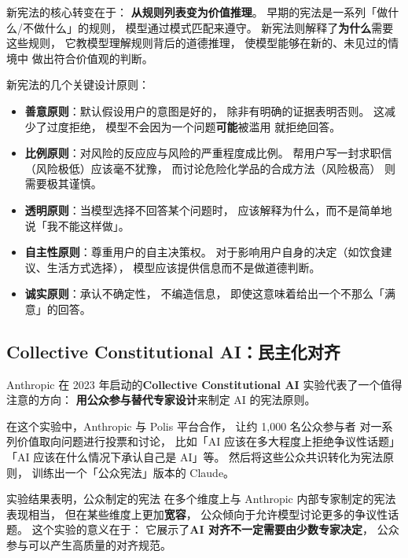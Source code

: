 
新宪法的核心转变在于：
\textbf{从规则列表变为价值推理}。
早期的宪法是一系列「做什么/不做什么」的规则，
模型通过模式匹配来遵守。
新宪法则解释了\textbf{为什么}需要这些规则，
它教模型理解规则背后的道德推理，
使模型能够在新的、未见过的情境中
做出符合价值观的判断。

新宪法的几个关键设计原则：
\begin{itemize}[noitemsep]
  \item \textbf{善意原则}：默认假设用户的意图是好的，
        除非有明确的证据表明否则。
        这减少了过度拒绝，
        模型不会因为一个问题\textbf{可能}被滥用
        就拒绝回答。
  \item \textbf{比例原则}：对风险的反应应与风险的严重程度成比例。
        帮用户写一封求职信（风险极低）应该毫不犹豫，
        而讨论危险化学品的合成方法（风险极高）
        则需要极其谨慎。
  \item \textbf{透明原则}：当模型选择不回答某个问题时，
        应该解释为什么，而不是简单地说「我不能这样做」。
  \item \textbf{自主性原则}：尊重用户的自主决策权。
        对于影响用户自身的决定（如饮食建议、生活方式选择），
        模型应该提供信息而不是做道德判断。
  \item \textbf{诚实原则}：承认不确定性，
        不编造信息，
        即使这意味着给出一个不那么「满意」的回答。
\end{itemize}

\subsection{Collective Constitutional AI：民主化对齐}


Anthropic 在 2023 年启动的\textbf{Collective Constitutional AI}
实验代表了一个值得注意的方向：
\textbf{用公众参与替代专家设计}来制定 AI 的宪法原则。

在这个实验中，Anthropic 与 Polis 平台合作，
让约 1,000 名公众参与者
对一系列价值取向问题进行投票和讨论，
比如「AI 应该在多大程度上拒绝争议性话题」
「AI 应该在什么情况下承认自己是 AI」等。
然后将这些公众共识转化为宪法原则，
训练出一个「公众宪法」版本的 Claude。

实验结果表明，公众制定的宪法
在多个维度上与 Anthropic 内部专家制定的宪法表现相当，
但在某些维度上更加\textbf{宽容}，
公众倾向于允许模型讨论更多的争议性话题。
这个实验的意义在于：
它展示了\textbf{AI 对齐不一定需要由少数专家决定}，
公众参与可以产生高质量的对齐规范。

